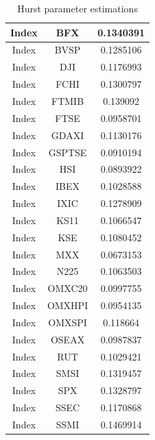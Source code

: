 \begin{table}[htbp]
\begin{tabular}{|c|c|c|}
                Index                    &  BFX & 0.1340391 \\ \hline
                Index                    &  BVSP & 0.1285106 \\ \hline
                Index                    &  DJI & 0.1176993 \\ \hline
                Index                    &  FCHI & 0.1300797 \\ \hline
                Index                    &  FTMIB & 0.139092 \\ \hline
                Index                    &  FTSE & 0.0958701 \\ \hline
                Index                    &  GDAXI & 0.1130176 \\ \hline
                Index                    &  GSPTSE & 0.0910194 \\ \hline
                Index                    &  HSI & 0.0893922 \\ \hline
                Index                    &  IBEX & 0.1028588 \\ \hline
                Index                    &  IXIC & 0.1278909 \\ \hline
                Index                    &  KS11 & 0.1066547 \\ \hline
                Index                    &  KSE & 0.1080452 \\ \hline
                Index                    &  MXX & 0.0673153 \\ \hline
                Index                    &  N225 & 0.1063503 \\ \hline
                Index                    &  OMXC20 & 0.0997755 \\ \hline
                Index                    &  OMXHPI & 0.0954135 \\ \hline
                Index                    &  OMXSPI & 0.118664 \\ \hline
                Index                    &  OSEAX & 0.0987837 \\ \hline
                Index                    &  RUT & 0.1029421 \\ \hline
                Index                    &  SMSI & 0.1319457 \\ \hline
                Index                    &  SPX & 0.1328797 \\ \hline
                Index                    &  SSEC & 0.1170868 \\ \hline
                Index                    &  SSMI & 0.1469914 \\ \hline
            \end{tabular}
            \caption{Hurst parameter estimations}
            \label{table:hurst_est}
        \end{table}



